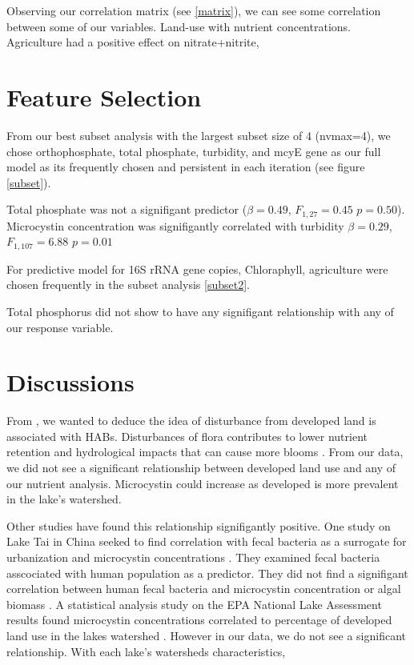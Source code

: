 Observing our correlation matrix (see \ref{matrix}), we can see some correlation between some of our variables. Land-use with nutrient concentrations. Agriculture had a positive effect on nitrate+nitrite,



\section{Feature Selection}

From our best subset analysis with the largest subset size of 4 (nvmax=4), we chose orthophosphate, total phosphate, turbidity,  and mcyE gene as our full model as its frequently chosen and persistent in each iteration (see figure \ref{subset}).

Total phosphate was not a signifigant predictor ($\beta=0.49$, $F_{{1,27}}=0.45$ $p=0.50$).
Microcystin concentration was signifigantly correlated with turbidity {$\beta=0.29$, $F_{{1,107}}=6.88$ $p=0.01$}

For predictive model for 16S rRNA gene copies, Chloraphyll, agriculture were chosen frequently in the subset analysis \ref{subset2}.

Total phosphorus did not show to have any signifigant relationship with any of our response variable.

\section{Discussions}






From , we wanted to deduce the idea of disturbance from developed land is associated with HABs. Disturbances of flora contributes to lower nutrient retention and hydrological impacts that can cause more blooms \cite{anderson_harmful_2002, codd_cyanobacterial_2000, fraterrigo_influence_2008}. From our data, we did not see a significant relationship between developed land use and any of our nutrient analysis.
Microcystin could increase as developed is more prevalent in the lake's watershed.

Other studies have found this relationship signifigantly positive.
One study on Lake Tai in China seeked to find correlation with fecal bacteria as a surrogate for urbanization and microcystin concentrations \cite{wilhelm_relationships_2011}.
They examined fecal bacteria asscociated with human population as a predictor. They did not find a signifigant correlation between human fecal bacteria and microcystin concentration or algal biomass \cite{wilhelm_relationships_2011}.
A statistical analysis study  on the EPA National Lake Assessment results found microcystin concentrations correlated to percentage of developed land use in the lakes watershed \cite{beaver_land_2014}. However in our data, we do not see a significant relationship. With each lake's watersheds characteristics,


